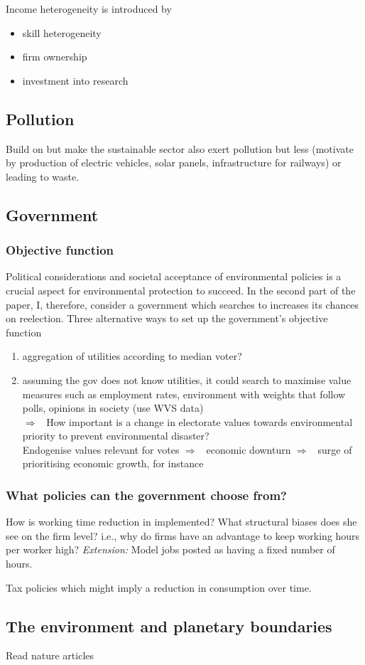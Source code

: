 \documentclass[12pt]{article}
\newcommand{\ar}{$\Rightarrow$ \ }
\begin{document}
\noindent Income heterogeneity is introduced by
\begin{itemize}
\item skill heterogeneity
\item firm ownership
\item investment into research
\end{itemize}

\subsection{Pollution}
Build on \cite{Acemoglu2012TheChange} but make the sustainable sector also exert pollution but less (motivate by production of electric vehicles, solar panels, infrastructure for railways) or leading to waste.  
\subsection{Government}
\subsubsection{Objective function}
Political considerations and societal acceptance of environmental policies is a crucial aspect for environmental protection to succeed. 
In the second part of the paper, I, therefore, consider a government which searches to increases its chances on reelection. 
Three alternative ways to set up the government's objective function
\begin{enumerate}
	\item aggregation of utilities according to median voter?
	\item assuming the gov does not know utilities, it could search to maximise value measures such as employment rates, environment with weights that follow polls, opinions in society (use WVS data)\\ \ar How important is a change in electorate values towards environmental priority to prevent environmental disaster?\\
	Endogenise values relevant for votes \ar economic downturn \ar surge of prioritising economic growth, for instance
\end{enumerate}

\subsubsection{What policies can the government choose from?}
How is working time reduction in \cite{Schor2005SustainableReduction} implemented?
What structural biases does she see on the firm level? i.e., why do firms have an advantage to keep working hours per worker high?
\textit{Extension:} Model jobs posted as having a fixed number of hours.

Tax policies which might imply a reduction in consumption over time.

\subsection{The environment and planetary boundaries}

Read nature articles

\clearpage

\end{document}
